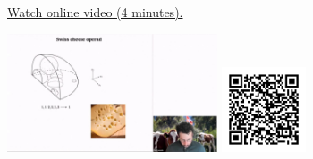 
\begin{minipage}{10cm}
    \href{https://act4e-spring21.netlify.app/videos/spring2021-operads-a:swiss-cheese-operad.html}{Watch online video (4 minutes).}
        
    \href{https://act4e-spring21.netlify.app/videos/spring2021-operads-a:swiss-cheese-operad.html}{\includegraphics[height=3.5cm]{spring2021-operads-a:swiss-cheese-operad/thumbnails.jpg}}
    \href{https://act4e-spring21.netlify.app/videos/spring2021-operads-a:swiss-cheese-operad.html}{\includegraphics[height=2.5cm]{spring2021-operads-a:swiss-cheese-operad/qrcode.png}}
\end{minipage}
